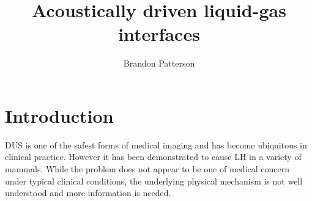 \documentclass{article}
\title{Acoustically driven liquid-gas interfaces}
\author{Brandon Patterson}
\begin{document}
\begin{acronym}%
\end{acronym}%

\maketitle


\acresetall

%

\section{Introduction}%
\label{sec:introduction}%
% 
\ac{DUS} is one of the safest forms of medical imaging and has become
ubiquitous in clinical practice. However it has been demonstrated to
cause \ac{LH} in a variety of mammals. While the problem does not
appear to be one of medical concern under typical clinical conditions,
the underlying physical mechanism is not well understood and more
information is needed. 
\end{document}
